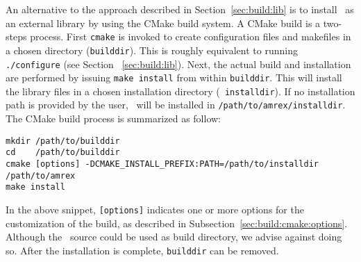 An alternative to the approach described in Section~\ref{sec:build:lib}
is to install \amrex\ as an external library by using the CMake build system.
A CMake build is a two-steps process. First {\tt cmake} is invoked to create 
configuration files and makefiles in a chosen directory ({\tt builddir}). 
This is roughly equivalent to running  {\tt ./configure} (see Section
~\ref{sec:build:lib}). Next, the actual build and installation are performed
by issuing {\tt make install} from within {\tt builddir}. This will install
the library files in a chosen installation directory ({\tt
  installdir}). If no installation path is provided by the user,
\amrex\ will be installed in {\tt /path/to/amrex/installdir}.
The CMake build process is summarized as follow:
\begin{verbatim}
mkdir /path/to/builddir
cd    /path/to/builddir
cmake [options] -DCMAKE_INSTALL_PREFIX:PATH=/path/to/installdir  /path/to/amrex 
make install
\end{verbatim} 
In the above snippet, {\tt [options]} indicates one or more options for the customization
of the build, as described in Subsection~\ref{sec:build:cmake:options}. 
Although the \amrex\ source could be used as build directory, we advise against doing so.
After the installation is complete, {\tt builddir} can be removed. 
